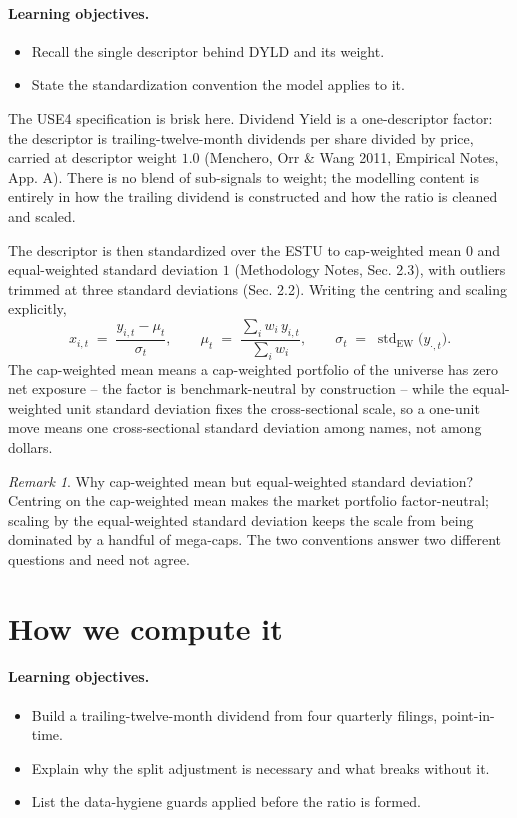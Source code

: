 \documentclass[11pt]{article}
\theoremstyle{definition}
\theoremstyle{plain}
\theoremstyle{remark}
\newtheorem*{remark}{Remark}
\DeclareMathOperator{\std}{std}
\begin{document}
\paragraph{Learning objectives.}
\begin{itemize}[leftmargin=1.4em,topsep=2pt]
  \item Recall the single descriptor behind DYLD and its weight.
  \item State the standardization convention the model applies to it.
\end{itemize}

The USE4 specification is brisk here. Dividend Yield is a one-descriptor factor: the descriptor is trailing-twelve-month dividends per share divided by price, carried at descriptor weight $1.0$ (Menchero, Orr \& Wang 2011, Empirical Notes, App. A). There is no blend of sub-signals to weight; the modelling content is entirely in how the trailing dividend is constructed and how the ratio is cleaned and scaled.

The descriptor is then standardized over the ESTU to cap-weighted mean $0$ and equal-weighted standard deviation $1$ (Methodology Notes, Sec. 2.3), with outliers trimmed at three standard deviations (Sec. 2.2). Writing the centring and scaling explicitly,
\[
x_{i,t} \;=\; \frac{y_{i,t}-\mu_t}{\sigma_t}, \qquad
\mu_t \;=\; \frac{\sum_i w_i\, y_{i,t}}{\sum_i w_i}, \qquad
\sigma_t \;=\; \std_{\text{EW}}\!\big(y_{\cdot,t}\big).
\]
The cap-weighted mean means a cap-weighted portfolio of the universe has zero net exposure -- the factor is benchmark-neutral by construction -- while the equal-weighted unit standard deviation fixes the cross-sectional scale, so a one-unit move means one cross-sectional standard deviation among names, not among dollars.

\begin{remark}
Why cap-weighted mean but equal-weighted standard deviation? Centring on the cap-weighted mean makes the market portfolio factor-neutral; scaling by the equal-weighted standard deviation keeps the scale from being dominated by a handful of mega-caps. The two conventions answer two different questions and need not agree.
\end{remark}

\section{How we compute it}\label{sec:compute}

\paragraph{Learning objectives.}
\begin{itemize}[leftmargin=1.4em,topsep=2pt]
  \item Build a trailing-twelve-month dividend from four quarterly filings, point-in-time.
  \item Explain why the split adjustment is necessary and what breaks without it.
  \item List the data-hygiene guards applied before the ratio is formed.
\end{itemize}
\end{document}
